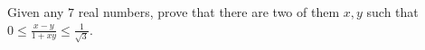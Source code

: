 Given any $7$ real numbers, prove that there are two of them $x,y$ such that $0\le\frac{x-y}{1+xy}\le\frac{1}{\sqrt{3}}$.